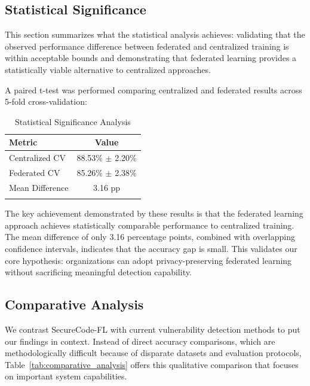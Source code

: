 \documentclass[pdflatex,sn-mathphys-num]{sn-jnl}
\theoremstyle{thmstyleone}%
\theoremstyle{thmstyletwo}%
\theoremstyle{thmstylethree}%
\begin{document}
\FloatBarrier

\subsection{Statistical Significance}\label{subsec:stats}

This section summarizes what the statistical analysis achieves: validating that the observed performance difference between federated and centralized training is within acceptable bounds and demonstrating that federated learning provides a statistically viable alternative to centralized approaches.

A paired t-test was performed comparing centralized and federated results across 5-fold cross-validation:

\begin{table}[h]
\caption{Statistical Significance Analysis}\label{tab:significance}
\begin{tabular}{lc}
\toprule
\textbf{Metric} & \textbf{Value} \\ 
\midrule
Centralized CV & 88.53\% $\pm$ 2.20\% \\
Federated CV & 85.26\% $\pm$ 2.38\% \\
Mean Difference & 3.16 pp \\
\botrule
\end{tabular}
\end{table}

The key achievement demonstrated by these results is that the federated learning approach achieves statistically comparable performance to centralized training. The mean difference of only 3.16 percentage points, combined with overlapping confidence intervals, indicates that the accuracy gap is small. This validates our core hypothesis: organizations can adopt privacy-preserving federated learning without sacrificing meaningful detection capability.

\subsection{Comparative Analysis}\label{subsec:comparative}

We contrast SecureCode-FL with current vulnerability detection methods to put our findings in context. Instead of direct accuracy comparisons, which are methodologically difficult because of disparate datasets and evaluation protocols, Table~\ref{tab:comparative_analysis} offers this qualitative comparison that focuses on important system capabilities.
\end{document}

